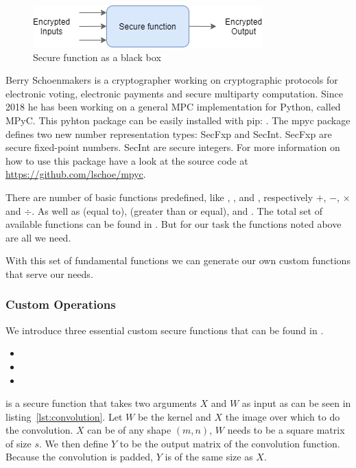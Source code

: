 \begin{figure}[H]
  \includegraphics[scale=0.8]{plots/blackbox.png}
  \centering
  \caption{Secure function as a black box}
  \label{fig:blackbox}
\end{figure}

Berry Schoenmakers is a cryptographer working on cryptographic protocols for electronic voting, electronic payments and secure multiparty computation. Since 2018 he has been working on a general MPC implementation for Python, called MPyC. This pyhton package can be easily installed with pip: . The mpyc package defines two new number representation types: SecFxp and SecInt. SecFxp are secure fixed-point numbers. SecInt are secure integers. For more information on how to use this package have a look at the source code at \url{https://github.com/lschoe/mpyc}.

There are number of basic functions predefined, like , ,  and , respectively $+$, $-$, $\times$ and $\div$. As well as  (equal to),  (greater than or equal),  and . The total set of available functions can be found in . But for our task the functions noted above are all we need.

With this set of fundamental functions we can generate our own custom functions that serve our needs.

\subsubsection{Custom Operations}

We introduce three essential custom secure functions that can be found in .

\begin{itemize}
  \item {}
  \item {}
  \item {}
\end{itemize}

 is a secure function that takes two arguments $X$ and $W$ as input as can be seen in listing~\ref{lst:convolution}. Let $W$ be the kernel and $X$ the image over which to do the convolution. $X$ can be of any shape $(m, n)$, $W$ needs to be a square matrix of size $s$. We then define $Y$ to be the output matrix of the convolution function. Because the convolution is padded, $Y$ is of the same size as $X$.

